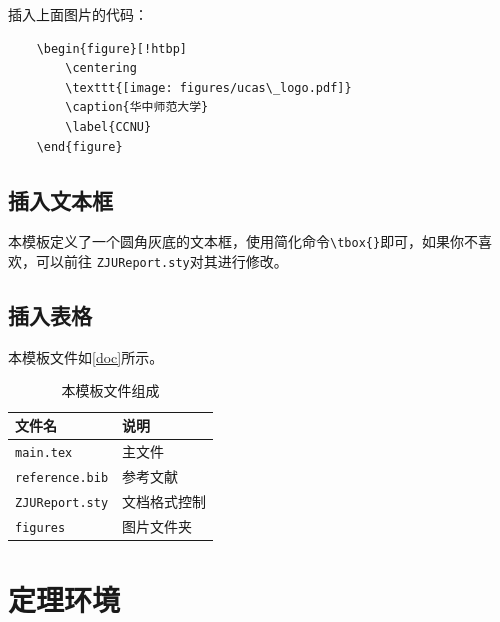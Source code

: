 \documentclass[12pt,hyperref,a4paper,UTF8]{ctexart}
\begin{document}
插入上面图片的代码：

\begin{verbatim}
    \begin{figure}[!htbp]
        \centering
        \texttt{[image: figures/ucas\_logo.pdf]}
        \caption{华中师范大学}
        \label{CCNU}
    \end{figure}
\end{verbatim}

\subsection{插入文本框}
本模板定义了一个圆角灰底的文本框，使用简化命令\verb|\tbox{}|即可，如果你不喜欢，可以前往 \texttt{ZJUReport.sty}对其进行修改。


\subsection{插入表格}
本模板文件如\autoref{doc}所示。
\begin{table}[!htbp]
    \centering
    \begin{tabular}{l  | l}
    \hline
        文件名 & 说明 \\
        \hline
        \texttt{main.tex}  & 主文件 \\
        \texttt{reference.bib} & 参考文献 \\
        \texttt{ZJUReport.sty}  & 文档格式控制\\
        \texttt{figures}  & 图片文件夹 \\
        \hline
    \end{tabular}
    \caption{本模板文件组成}
    \label{doc}
\end{table}

\section{定理环境}
\begin{Theorem}
\end{Theorem}

\begin{Lemma}
\end{Lemma}

\begin{Corollary}
\end{Corollary}

\begin{Proposition}
\end{Proposition}
\end{document}

